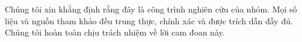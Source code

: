 \begin{pledge}
  Chúng tôi xin khẳng định rằng đây là công trình nghiên cứu của nhóm. Mọi số liệu và nguồn tham khảo đều trung thực, chính xác và được trích dẫn đầy đủ. Chúng tôi hoàn toàn chịu trách nhiệm về lời cam đoan này.
\end{pledge}
